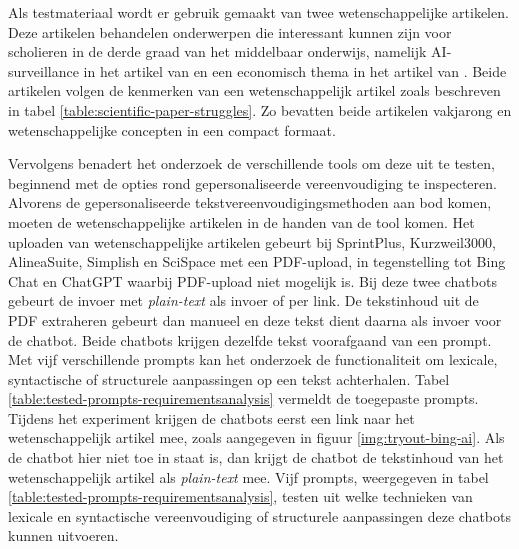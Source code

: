\medspace

Als testmateriaal wordt er gebruik gemaakt van twee wetenschappelijke artikelen. Deze artikelen behandelen onderwerpen die interessant kunnen zijn voor scholieren in de derde graad van het middelbaar onderwijs, namelijk AI-surveillance in het artikel van \textcite{VanBrakel2022} en een economisch thema in het artikel van \textcite{Sleuwaegen2022}. Beide artikelen volgen de kenmerken van een wetenschappelijk artikel zoals beschreven in tabel \ref{table:scientific-paper-struggles}. Zo bevatten beide artikelen vakjarong en wetenschappelijke concepten in een compact formaat.

\medspace

Vervolgens benadert het onderzoek de verschillende tools om deze uit te testen, beginnend met de opties rond gepersonaliseerde vereenvoudiging te inspecteren. Alvorens de gepersonaliseerde tekstvereenvoudigingsmethoden aan bod komen, moeten de wetenschappelijke artikelen in de handen van de tool komen. Het uploaden van wetenschappelijke artikelen gebeurt bij SprintPlus, Kurzweil3000, AlineaSuite, Simplish en SciSpace met een PDF-upload, in tegenstelling tot Bing Chat en ChatGPT waarbij PDF-upload niet mogelijk is. Bij deze twee chatbots gebeurt de invoer met \textit{plain-text} als invoer of per link. De tekstinhoud uit de PDF extraheren gebeurt dan manueel en deze tekst dient daarna als invoer voor de chatbot. Beide chatbots krijgen dezelfde tekst voorafgaand van een prompt. Met vijf verschillende prompts kan het onderzoek de functionaliteit om lexicale, syntactische of structurele aanpassingen op een tekst achterhalen. Tabel \ref{table:tested-prompts-requirementsanalysis} vermeldt de toegepaste prompts. Tijdens het experiment krijgen de chatbots eerst een link naar het wetenschappelijk artikel mee, zoals aangegeven in figuur \ref{img:tryout-bing-ai}. Als de chatbot hier niet toe in staat is, dan krijgt de chatbot de tekstinhoud van het wetenschappelijk artikel als \textit{plain-text} mee. Vijf prompts, weergegeven in tabel \ref{table:tested-prompts-requirementsanalysis}, testen uit welke technieken van lexicale en syntactische vereenvoudiging of structurele aanpassingen deze chatbots kunnen uitvoeren.

